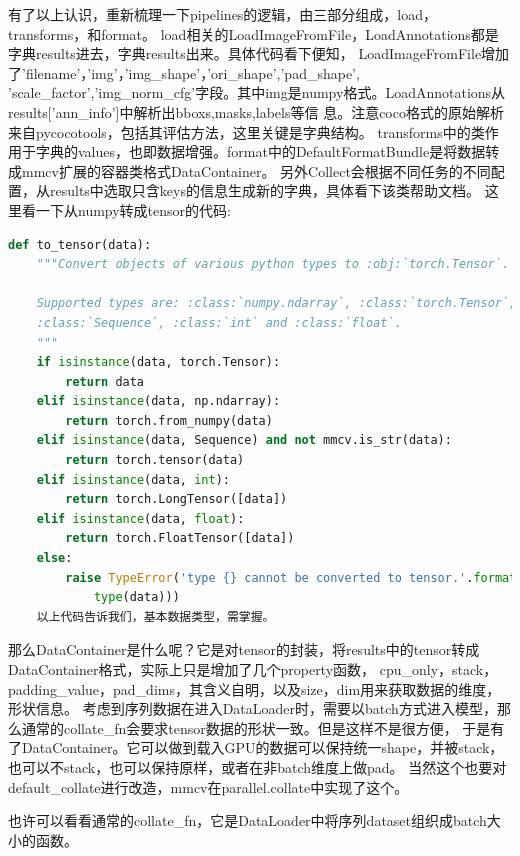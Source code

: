 \documentclass[UTF8]{ctexart}
\begin{document}
有了以上认识，重新梳理一下pipelines的逻辑，由三部分组成，load，transforms，和format。
load相关的LoadImageFromFile，LoadAnnotations都是字典results进去，字典results出来。具体代码看下便知，
LoadImageFromFile增加了'filename'，'img'，'img\_shape'，'ori\_shape','pad\_shape',
'scale\_factor','img\_norm\_cfg'字段。其中img是numpy格式。LoadAnnotations从results['ann\_info']中解析出bboxs,masks,labels等信
息。注意coco格式的原始解析来自pycocotools，包括其评估方法，这里关键是字典结构。
transforms中的类作用于字典的values，也即数据增强。format中的DefaultFormatBundle是将数据转成mmcv扩展的容器类格式DataContainer。
另外Collect会根据不同任务的不同配置，从results中选取只含keys的信息生成新的字典，具体看下该类帮助文档。
这里看一下从numpy转成tensor的代码:

\lstset{style=mystyle}
\begin{lstlisting}[language=Python]
def to_tensor(data):
    """Convert objects of various python types to :obj:`torch.Tensor`.

    Supported types are: :class:`numpy.ndarray`, :class:`torch.Tensor`,
    :class:`Sequence`, :class:`int` and :class:`float`.
    """
    if isinstance(data, torch.Tensor):
        return data
    elif isinstance(data, np.ndarray):
        return torch.from_numpy(data)
    elif isinstance(data, Sequence) and not mmcv.is_str(data):
        return torch.tensor(data)
    elif isinstance(data, int):
        return torch.LongTensor([data])
    elif isinstance(data, float):
        return torch.FloatTensor([data])
    else:
        raise TypeError('type {} cannot be converted to tensor.'.format(
			type(data)))
	以上代码告诉我们，基本数据类型，需掌握。
\end{lstlisting}

那么DataContainer是什么呢？它是对tensor的封装，将results中的tensor转成DataContainer格式，实际上只是增加了几个property函数，
cpu\_only，stack，padding\_value，pad\_dims，其含义自明，以及size，dim用来获取数据的维度，形状信息。
考虑到序列数据在进入DataLoader时，需要以batch方式进入模型，那么通常的collate\_fn会要求tensor数据的形状一致。但是这样不是很方便，
于是有了DataContainer。它可以做到载入GPU的数据可以保持统一shape，并被stack，也可以不stack，也可以保持原样，或者在非batch维度上做pad。
当然这个也要对default\_collate进行改造，mmcv在parallel.collate中实现了这个。

也许可以看看通常的collate\_fn，它是DataLoader中将序列dataset组织成batch大小的函数。
\end{document}
